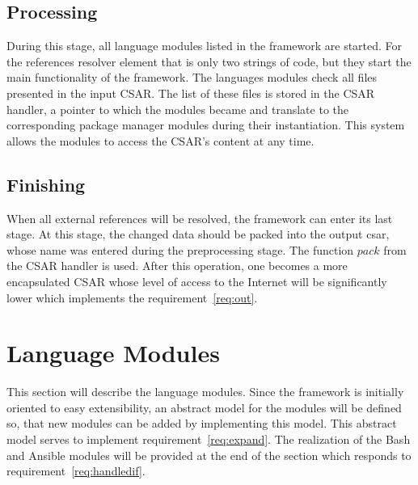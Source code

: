 \subsection*{Processing}
During this stage, all language modules listed in the framework are started.
For the references resolver element that is only two strings of code, but they start the main functionality of the framework.
The languages modules check all files presented in the input CSAR. 
The list of these files is stored in the CSAR handler, a pointer to which the modules became and translate to the corresponding package manager modules during their instantiation.
This system allows the modules to access the CSAR's content at any time.


\subsection*{Finishing}
When all external references will be resolved, the framework can enter its last stage.
At this stage, the changed data should be packed into the output \gls{csar}, whose name was entered during the preprocessing stage.
The function $pack$ from the CSAR handler is used. 
After this operation, one becomes a more encapsulated CSAR whose level of access to the Internet will be significantly lower which implements the requirement~\ref{req:out}.

\section{Language Modules} 
This section will describe the language modules. %
Since the framework is initially oriented to easy extensibility, an abstract model for the modules will be defined so, that new modules can be added by implementing this model.
This abstract model serves to implement requirement~\ref{req:expand}.
The realization of the Bash and Ansible modules will be provided at the end of the section which responds to requirement~\ref{req:handledif}.

